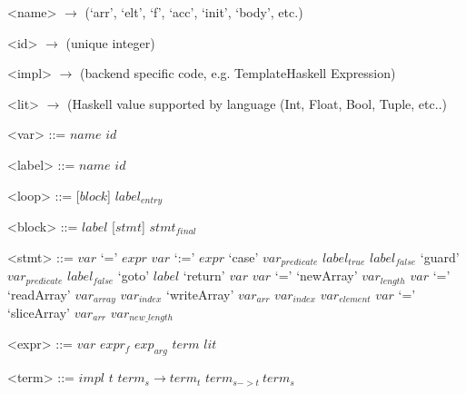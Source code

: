 
\setlength{\grammarindent}{5em} %
\renewcommand{\syntleft}{\normalfont\itshape} %
\renewcommand{\syntright}{}
\renewcommand{\litleft}{\ttfamily} %
\renewcommand{\litright}{}

\setlength{\grammarparsep}{0pt} %
\begin{grammar}
<name> $\rightarrow$ (`arr', `elt', `f', `acc', `init', `body', etc.)

<id>   $\rightarrow$ (unique integer)

<impl> $\rightarrow$ (backend specific code, e.g. TemplateHaskell Expression)

<lit>  $\rightarrow$ (Haskell value supported by language (Int, Float, Bool, Tuple, etc..)

<var>  ::= $name$ $id$

<label> ::= $name$ $id$

\end{grammar}

\setlength{\grammarparsep}{10pt plus 1pt minus 1pt} %
\begin{grammar}
<loop> ::= [$block$] $label_{entry}$

<block> ::= $label$ [$stmt$] $stmt_{final}$

<stmt> ::= $var$ `=' $expr$
      \alt $var$ `:=' $expr$
      \alt `case' $var_{predicate}$ $label_{true}$ $label_{false}$
      \alt `guard' $var_{predicate}$ $label_{false}$
      \alt `goto' $label$
      \alt `return' $var$
      \alt $var$ `=' `newArray' $var_{length}$
      \alt $var$ `=' `readArray' $var_{array}$ $var_{index}$
      \alt `writeArray' $var_{arr}$ $var_{index}$ $var_{element}$
      \alt $var$ `=' `sliceArray' $var_{arr}$ $var_{new\_length}$

<expr> ::= $var$
      \alt $expr_{\mathit{f}}$ $exp_{arg}$
      \alt $term$
      \alt $lit$

<term> ::= $impl$
      \alt $t$
      \alt $term_{s} \rightarrow term_{t}$
      \alt $term_{s->t}\ term_{s}$

\end{grammar}
